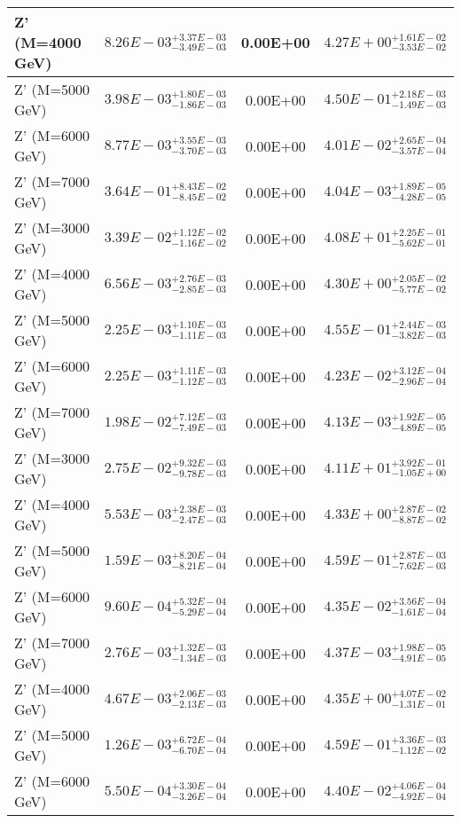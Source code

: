 \documentclass{article}
\begin{document}
\begin{center}
\begin{tabular}{ |l|c|c|c| }
 \hline
 Z' (M=4000 GeV) & $8.26E-03^{+3.37E-03}_{-3.49E-03}$ & 0.00E+00 & $4.27E+00^{+1.61E-02}_{-3.53E-02}$ \\
 \hline
 Z' (M=5000 GeV) & $3.98E-03^{+1.80E-03}_{-1.86E-03}$ & 0.00E+00 & $4.50E-01^{+2.18E-03}_{-1.49E-03}$ \\
 \hline
 Z' (M=6000 GeV) & $8.77E-03^{+3.55E-03}_{-3.70E-03}$ & 0.00E+00 & $4.01E-02^{+2.65E-04}_{-3.57E-04}$ \\
 \hline
 Z' (M=7000 GeV) & $3.64E-01^{+8.43E-02}_{-8.45E-02}$ & 0.00E+00 & $4.04E-03^{+1.89E-05}_{-4.28E-05}$ \\
 \hline
 Z' (M=3000 GeV) & $3.39E-02^{+1.12E-02}_{-1.16E-02}$ & 0.00E+00 & $4.08E+01^{+2.25E-01}_{-5.62E-01}$ \\
 \hline
 Z' (M=4000 GeV) & $6.56E-03^{+2.76E-03}_{-2.85E-03}$ & 0.00E+00 & $4.30E+00^{+2.05E-02}_{-5.77E-02}$ \\
 \hline
 Z' (M=5000 GeV) & $2.25E-03^{+1.10E-03}_{-1.11E-03}$ & 0.00E+00 & $4.55E-01^{+2.44E-03}_{-3.82E-03}$ \\
 \hline
 Z' (M=6000 GeV) & $2.25E-03^{+1.11E-03}_{-1.12E-03}$ & 0.00E+00 & $4.23E-02^{+3.12E-04}_{-2.96E-04}$ \\
 \hline
 Z' (M=7000 GeV) & $1.98E-02^{+7.12E-03}_{-7.49E-03}$ & 0.00E+00 & $4.13E-03^{+1.92E-05}_{-4.89E-05}$ \\
 \hline
 Z' (M=3000 GeV) & $2.75E-02^{+9.32E-03}_{-9.78E-03}$ & 0.00E+00 & $4.11E+01^{+3.92E-01}_{-1.05E+00}$ \\
 \hline
 Z' (M=4000 GeV) & $5.53E-03^{+2.38E-03}_{-2.47E-03}$ & 0.00E+00 & $4.33E+00^{+2.87E-02}_{-8.87E-02}$ \\
 \hline
 Z' (M=5000 GeV) & $1.59E-03^{+8.20E-04}_{-8.21E-04}$ & 0.00E+00 & $4.59E-01^{+2.87E-03}_{-7.62E-03}$ \\
 \hline
 Z' (M=6000 GeV) & $9.60E-04^{+5.32E-04}_{-5.29E-04}$ & 0.00E+00 & $4.35E-02^{+3.56E-04}_{-1.61E-04}$ \\
 \hline
 Z' (M=7000 GeV) & $2.76E-03^{+1.32E-03}_{-1.34E-03}$ & 0.00E+00 & $4.37E-03^{+1.98E-05}_{-4.91E-05}$ \\
 \hline
 Z' (M=4000 GeV) & $4.67E-03^{+2.06E-03}_{-2.13E-03}$ & 0.00E+00 & $4.35E+00^{+4.07E-02}_{-1.31E-01}$ \\
 \hline
 Z' (M=5000 GeV) & $1.26E-03^{+6.72E-04}_{-6.70E-04}$ & 0.00E+00 & $4.59E-01^{+3.36E-03}_{-1.12E-02}$ \\
 \hline
 Z' (M=6000 GeV) & $5.50E-04^{+3.30E-04}_{-3.26E-04}$ & 0.00E+00 & $4.40E-02^{+4.06E-04}_{-4.92E-04}$ \\

\end{tabular}
\end{center}
\end{document}

